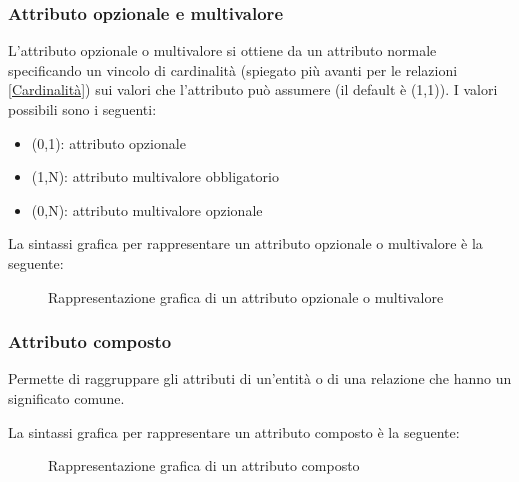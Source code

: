 \documentclass[a4paper,twoside]{article}
\begin{document}
\subsubsection{Attributo opzionale e multivalore}
L'attributo opzionale o multivalore si ottiene da un attributo normale specificando un vincolo
di cardinalità (spiegato più avanti per le relazioni \ref{Cardinalità}) sui valori che
l'attributo può assumere (il default è (1,1)). I valori possibili sono i seguenti:
\begin{itemize}
  \item (0,1): attributo opzionale
  \item (1,N): attributo multivalore obbligatorio
  \item (0,N): attributo multivalore opzionale
\end{itemize}

\vspace{1em}
\noindent
La sintassi grafica per rappresentare un attributo opzionale o multivalore è la seguente:
\begin{figure}[H]
  \centering
  \caption{Rappresentazione grafica di un attributo opzionale o multivalore}
\end{figure}

\subsubsection{Attributo composto}
Permette di raggruppare gli attributi di un'entità o di una relazione che hanno un significato
comune.

\vspace{1em}
\noindent
La sintassi grafica per rappresentare un attributo composto è la seguente:
\begin{figure}[H]
  \centering
  \caption{Rappresentazione grafica di un attributo composto}
\end{figure}
\end{document}
